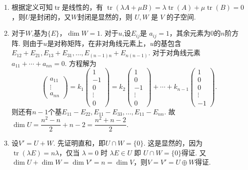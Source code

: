 \documentclass[12pt,fontset=fandol]{ctexart}
\begin{document}
\begin{solve}
\begin{enumerate}
                \item 根据定义可知$\operatorname{tr}$是线性的，有 $\operatorname{tr}(\lambda A+\mu B)=\lambda\operatorname{tr}(A)+\mu\operatorname{tr}(B)=0$，则$U$是封闭的，又$W$封闭是显然的，则 $U,W$ 是 $V$ 的子空间.

                \item 对于$W$,基为$\{E\}$，$\dim W=1$. 对于$u$,设$E_{ij}$是 $a_{ij}=1$，其余元素为0的$n$阶方阵. 则由于$u$是对称矩阵，在非对角线元素上，$u$的基包含$E_{12}+E_{21},E_{13}+E_{31},\ldots ,E_{(n-1)n}+E_{n(n-1)}$. 对于对角线元素 $a_{11}+\cdots +a_{nn}=0$. 方程解为
                      \[\begin{pmatrix}a_{11}\\ \vdots\\ a_{nn}	\end{pmatrix}=k_1\begin{pmatrix}1 \\ -1 \\ 0\\ \vdots \\0	\end{pmatrix}=k_2\begin{pmatrix}1 \\ 0 \\ -1\\ \vdots \\0	\end{pmatrix}+\cdots+k_{n-1}\begin{pmatrix}1 \\ 0 \\ 0\\ \vdots \\-1	\end{pmatrix}.\]
                      则还有$n-1$个基$E_{11}-E_{22},E_{11}-E_{33},\ldots ,E_{11}-E_{nn}$. 故 $\dim U=\dfrac{n^2-n}2+n-2=\dfrac{n^2+n-2}2$.

                \item 设$V'=U+W$. 先证明直和，即$U\cap W=\{0\}$. 这是显然的，因为$\operatorname{tr}(\lambda E)=n\lambda$，仅当 $\lambda=0$ 时 $\lambda E\in U$ 即 $U\cap W=\{0\}$得证. 又$\dim U+\dim W=\dim V'=n=\dim V$，则$V=V'=U\oplus W$得证.
            \end{enumerate}
\end{solve}
\end{document}
